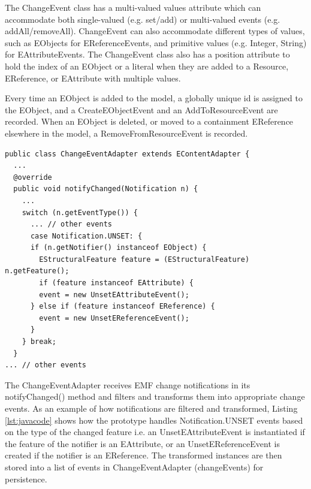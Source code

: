 The \textsf{ChangeEvent} class has a multi-valued \textsf{values} attribute which can accommodate both single-valued (e.g. set/add) or multi-valued events (e.g. addAll/removeAll). \textsf{ChangeEvent} can also accommodate different types of values, such as \textsf{EObject}s for \textsf{EReferenceEvents}, and primitive values (e.g. Integer, String) for \textsf{EAttributeEvents}. The \textsf{ChangeEvent} class also has a position attribute to hold the  index of an \textsf{EObject} or a literal when they are added to a \textsf{Resource}, \textsf{EReference}, or \textsf{EAttribute} with multiple values. 

Every time an \textsf{EObject} is added to the model, a globally unique id is assigned to the \textsf{EObject}, and a \textsf{CreateEObjectEvent} and an \textsf{AddToResourceEvent} are recorded. When an EObject is deleted, or moved to a containment \textsf{EReference} elsewhere in the model, a \textsf{RemoveFromResourceEvent}
is recorded.

\vspace{-20pt}
\begin{lstlisting}[style=java,caption={Simplified Java code to handle notification events.},label=lst:javacode]
public class ChangeEventAdapter extends EContentAdapter {
  ...
  @override
  public void notifyChanged(Notification n) {
    ...
    switch (n.getEventType()) {
      ... // other events
      case Notification.UNSET: {
      if (n.getNotifier() instanceof EObject) {
        EStructuralFeature feature = (EStructuralFeature) n.getFeature();
        if (feature instanceof EAttribute) {
        event = new UnsetEAttributeEvent();
      } else if (feature instanceof EReference) {
        event = new UnsetEReferenceEvent();
      }
    } break;
  } 
... // other events
\end{lstlisting}	

The \textsf{ChangeEventAdapter} receives EMF change notifications in its \textsf{notifyChanged()} method and filters and transforms them into appropriate change events. As an example of how notifications are filtered and transformed, Listing \ref{lst:javacode} shows how the prototype handles \textsf{Notification.UNSET} events based on the type of the changed feature i.e. an \textsf{UnsetEAttributeEvent} is instantiated if the feature of the notifier is an \textsf{EAttribute}, or an \textsf{UnsetEReferenceEvent}  is created if the notifier is an \textsf{EReference}. The transformed instances are then stored into a list of events in \textsf{ChangeEventAdapter} (\textsf{changeEvents}) for persistence. 

